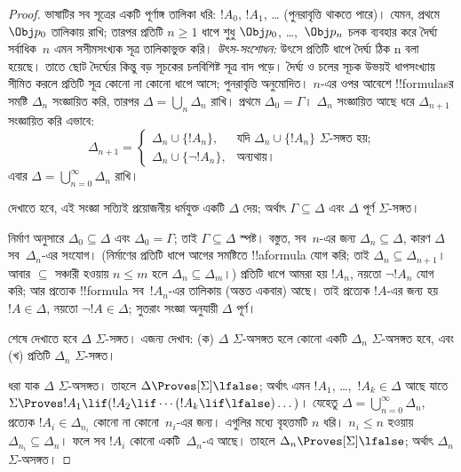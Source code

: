 \documentclass[../../../include/open-logic-section]{subfiles}
\begin{document}
\begin{proof}
ভাষাটির সব সূত্রের একটি পূর্ণাঙ্গ তালিকা ধরি: $!A_0$, $!A_1$, \dots{} (পুনরাবৃত্তি থাকতে পারে)। যেমন, প্রথমে $\Obj p_0$ তালিকায় রাখি; তারপর প্রতিটি $n \ge 1$ ধাপে শুধু $\Obj p_0$, \dots,~$\Obj p_n$ চলক ব্যবহার করে দৈর্ঘ্য সর্বাধিক~$n$ এমন সসীমসংখ্যক সূত্র তালিকাভুক্ত করি।
\emph{উৎস-সংশোধন:} উৎসে প্রতিটি ধাপে দৈর্ঘ্য ঠিক n বলা হয়েছে। তাতে ছোট দৈর্ঘ্যের কিন্তু বড় সূচকের চলবিশিষ্ট সূত্র বাদ পড়ে। দৈর্ঘ্য ও চলের সূচক উভয়ই ধাপসংখ্যায় সীমিত করলে প্রতিটি সূত্র কোনো না কোনো ধাপে আসে; পুনরাবৃত্তি অনুমোদিত।
$n$-এর ওপর আবেশে !!{formula}sর সমষ্টি $\Delta_n$ সংজ্ঞায়িত করি, তারপর $\Delta = \bigcup_n \Delta_n$ রাখি। প্রথমে $\Delta_0 = \Gamma$। $\Delta_n$ সংজ্ঞায়িত আছে ধরে $\Delta_{n+1}$ সংজ্ঞায়িত করি এভাবে:
\[
\Delta_{n+1} =
\begin{cases}
  \Delta_n \cup \{!A_n\}, & \text{যদি $\Delta_n \cup \{ !A_n\}$
    $\Sigma$-সঙ্গত হয়;} \\
  \Delta_n \cup \{ \lnot !A_n\}, & \text{অন্যথায়।}
\end{cases}
\]
এবার $\Delta = \bigcup_{n=0}^\infty \Delta_n$ রাখি।

দেখাতে হবে, এই সংজ্ঞা সত্যিই প্রয়োজনীয় ধর্মযুক্ত একটি $\Delta$ দেয়; অর্থাৎ $\Gamma \subseteq \Delta$ এবং $\Delta$ পূর্ণ $\Sigma$-সঙ্গত।

নির্মাণ অনুসারে $\Delta_0 \subseteq \Delta$ এবং $\Delta_0 = \Gamma$; তাই $\Gamma \subseteq \Delta$ স্পষ্ট। বস্তুত, সব~$n$-এর জন্য $\Delta_n \subseteq \Delta$, কারণ $\Delta$ সব~$\Delta_n$-এর সংযোগ। (নির্মাণের প্রতিটি ধাপে আগের সমষ্টিতে !!a{formula} যোগ করি; তাই $\Delta_n \subseteq \Delta_{n+1}$। আবার $\subseteq$ সঞ্চারী হওয়ায় $n \le m$ হলে $\Delta_n \subseteq \Delta_{m}$।) প্রতিটি ধাপে আমরা হয় $!A_n$, নয়তো $\lnot !A_n$ যোগ করি; আর প্রত্যেক !!{formula} সব~$!A_n$-এর তালিকায় (অন্তত একবার) আছে। তাই প্রত্যেক $!A$-এর জন্য হয় $!A \in \Delta$, নয়তো $\lnot !A \in \Delta$; সুতরাং সংজ্ঞা অনুযায়ী $\Delta$ পূর্ণ।

শেষে দেখাতে হবে $\Delta$ $\Sigma$-সঙ্গত। এজন্য দেখাব: (ক) $\Delta$ $\Sigma$-অসঙ্গত হলে কোনো একটি $\Delta_n$ $\Sigma$-অসঙ্গত হবে, এবং (খ) প্রতিটি $\Delta_n$ $\Sigma$-সঙ্গত।

ধরা যাক $\Delta$ $\Sigma$-অসঙ্গত। তাহলে $\Delta \Proves[\Sigma] \lfalse$; অর্থাৎ এমন $!A_1$, \dots,~$!A_k \in \Delta$ আছে যাতে $\Sigma \Proves !A_1 \lif (!A_2 \lif \cdots (!A_k \lif \lfalse)\dots)$। যেহেতু $\Delta = \bigcup_{n=0}^\infty \Delta_n$, প্রত্যেক $!A_i \in \Delta_{n_i}$ কোনো না কোনো~$n_i$-এর জন্য। এগুলির মধ্যে বৃহত্তমটি $n$ ধরি। $n_i \le n$ হওয়ায় $\Delta_{n_i} \subseteq \Delta_n$। ফলে সব $!A_i$ কোনো একটি~$\Delta_n$-এ আছে। তাহলে $\Delta_n \Proves[\Sigma] \lfalse$; অর্থাৎ $\Delta_n$ $\Sigma$-অসঙ্গত।


\end{proof}
\end{document}
